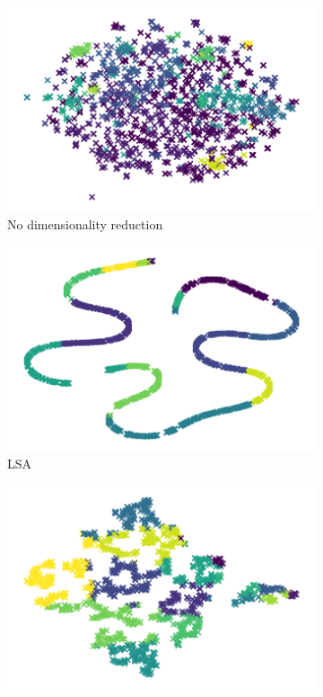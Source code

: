 \begin{figure}
\centering
\begin{subfigure}{.3\textwidth}
    \centering
    \includegraphics[width=\linewidth]{imgs/birch.png}
    \caption{No dimensionality reduction}
    \label{fig:birch_no_dim}
\end{subfigure}
\begin{subfigure}{.3\textwidth}
  \centering
  \includegraphics[width=\linewidth]{imgs/birch_lsa.png}
  \caption{LSA}
  \label{fig:birch_lsa}
\end{subfigure}%
\begin{subfigure}{.3\textwidth}
  \centering
  \includegraphics[width=\linewidth]{imgs/birch_spectral.png}

\end{subfigure}
\end{figure}
